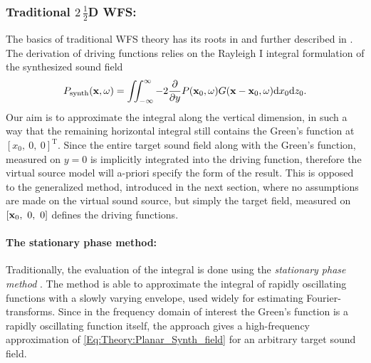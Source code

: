 \subsubsection{Traditional $2\, \frac{1}{2}$D WFS:\\}
The basics of traditional WFS theory has its roots in \cite{Berkhout1993:Acoustic_control_by_WFS,Berkhout1988:Holographic_approach} and further described in \cite{Vogel1993:phd, Start1997:phd, Verheijen1997:phd}.
The derivation of driving functions relies on the Rayleigh I integral formulation of the synthesized sound field
\begin{equation}
P_{\mathrm{synth}}(\mathbf{x},\omega) = \iint_{-\infty}^{\infty} -2\frac{\partial}{\partial y} P(\mathbf{x}_0,\omega) G(\mathbf{x}-\mathbf{x}_0,\omega) \mathrm{d} x_0 \mathrm{d} z_0.
\label{Eq:Theory:Planar_Synth_field}
\end{equation}
Our aim is to approximate the integral along the vertical dimension, in such a way that the remaining horizontal integral still contains the Green's function at $[x_0,\ 0,\ 0]^{\mathrm{T}}$. Since the entire target sound field along with the Green's function, measured on $y=0$ is implicitly integrated into the driving function, therefore the virtual source model will a-priori specify the form of the result. This is opposed to the generalized method, introduced in the next section, where no assumptions are made on the virtual sound source, but simply the target field, measured on $[\vxo,\ 0,\ 0]$ defines the driving functions.

\vspace{3mm}
\paragraph{The stationary phase method:}
Traditionally, the evaluation of the integral is done using the \emph{stationary phase method} \cite{Berkhout1993:Acoustic_control_by_WFS}. The method is able to approximate the integral of rapidly oscillating functions with a slowly varying envelope, used widely for estimating Fourier-transforms.
Since in the frequency domain of interest the Green's function is a rapidly oscillating function itself, the approach gives a high-frequency approximation of \eqref{Eq:Theory:Planar_Synth_field} for an arbitrary target sound field.

